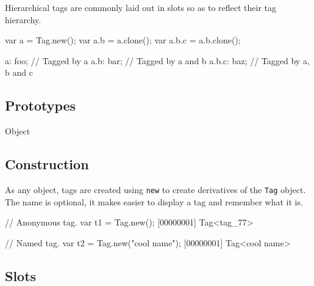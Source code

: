 Hierarchical tags are commonly laid out in slots so as to reflect their tag
hierarchy.

\begin{urbiunchecked}
var a = Tag.new();
var a.b = a.clone();
var a.b.c = a.b.clone();

a:     foo; // Tagged by a
a.b:   bar; // Tagged by a and b
a.b.c: baz; // Tagged by a, b and c
\end{urbiunchecked}


\subsection{Prototypes}
\begin{refObjects}
\item[Object]
\end{refObjects}

\subsection{Construction}
\label{stdlib:tag:ctor}

As any object, tags are created using \lstinline{new} to create derivatives
of the \lstinline{Tag} object.  The name is optional, it makes easier to
display a tag and remember what it is.

\begin{urbiscript}[firstnumber=1]
// Anonymous tag.
var t1 = Tag.new();
[00000001] Tag<tag_77>

// Named tag.
var t2 = Tag.new("cool name");
[00000001] Tag<cool name>
\end{urbiscript}

\subsection{Slots}

